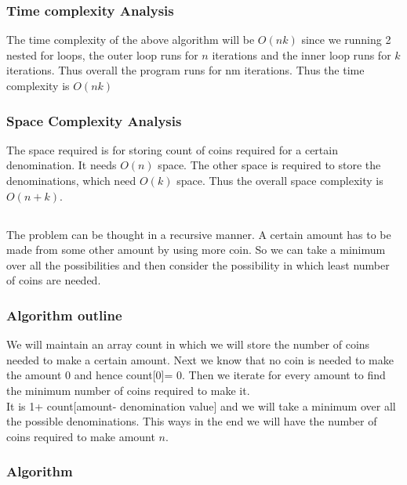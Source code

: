 \documentclass{article}
\begin{document}
\subsubsection{Time complexity Analysis}
The time complexity of the above algorithm will be $O(nk)$ since we running 2 nested for loops, the outer loop runs for $n$ iterations and the inner loop runs for $k$  iterations. Thus overall the program runs for nm iterations. Thus the time complexity is $O(nk)$
\subsubsection{Space Complexity Analysis}
The space required is for storing count of coins required for a certain denomination. It needs $O(n)$ space. The other space is required to store the denominations, which need $O(k)$ space. Thus the overall space complexity is $O(n+k)$.

\newpage
\subsection{}
The problem can be thought in a recursive manner. A certain amount has to be made from some other amount by using more coin. So we can take a minimum over all the possibilities and then consider the possibility in which least number of coins are needed.  

\subsubsection{Algorithm outline}
We will maintain an array count in which we will store the number of coins needed to make a certain amount. Next we know that no coin is needed to make the amount 0 and hence count[0]= 0. Then we iterate for every amount to find the minimum number of coins required to make it. \\It is 1+ count[amount- denomination value] and we will take a minimum over all the possible denominations. This ways in the end we will have the number of coins required to make amount $n$.

\subsubsection{Algorithm}

\end{document}
